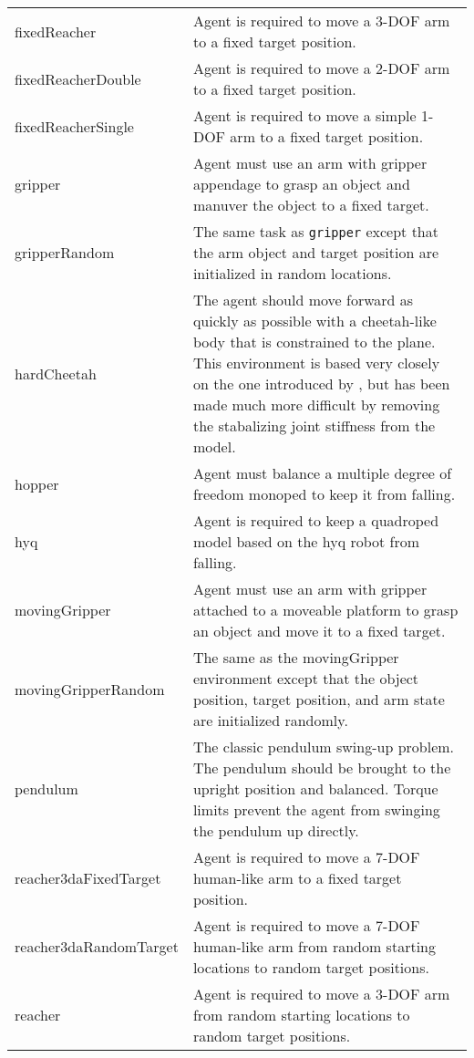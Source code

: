 \documentclass{article} \usepackage{iclr2016_conference,times}
\begin{document}
\begin{center}
\begin{longtable}{ l | p{10cm} }
fixedReacher                 & Agent is required to move a 3-DOF arm to a fixed target position. \\
fixedReacherDouble           & Agent is required to move a 2-DOF arm to a fixed target position. \\
fixedReacherSingle           & Agent is required to move a simple 1-DOF arm to a fixed target position. \\
gripper                      & Agent must use an arm with gripper appendage to grasp an object and manuver the object to a fixed target.      \\
gripperRandom                & The same task as {\tt gripper} except that the arm object and target position are initialized in random locations. \\
hardCheetah                  & The agent should move forward as quickly as possible with a cheetah-like body that is constrained to the plane.  This environment is based very closely on the one introduced by \citet{wawrzynski2009real,wawrzynski2013autonomous}, but has been made much more difficult by removing the stabalizing joint stiffness from the model. \\
hopper                       & Agent must balance a multiple degree of freedom monoped to keep it from falling.      \\
hyq                          & Agent is required to keep a quadroped model based on the hyq robot from falling. \\
movingGripper                & Agent must use an arm with gripper attached to a moveable platform to grasp an object and move it to a fixed target. \\
movingGripperRandom          & The same as the movingGripper environment except that the object position, target position, and arm state are initialized randomly. \\
pendulum                     & The classic pendulum swing-up problem.  The pendulum should be brought to the upright position and balanced.  Torque limits prevent the agent from swinging the pendulum up directly. \\
reacher3daFixedTarget        & Agent is required to move a 7-DOF human-like arm to a fixed target position.      \\
reacher3daRandomTarget       & Agent is required to move a 7-DOF human-like arm from random starting locations to random target positions. \\
reacher                      & Agent is required to move a 3-DOF arm from random starting locations to random target positions. \\

\end{longtable}
\end{center}
\end{document}
